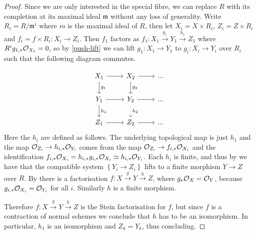 \begin{proof}
	Since we are only interested in the special fibre, we can replace $R$ with its completion at its maximal ideal $\mathfrak{m}$ without any loss of generality.
	Write $R_{i}=R/\mathfrak{m}^{i}$ where $m$ is the maximal ideal of $R$, then let $X_{i}=X \times R_{i}$, $Z_{i}=Z\times R_{i}$ and $f_{i}=f\times R_{i}\colon X_{i} \to Z_{i}$.
	Then $f_{1}$ factors as $f_{1}\colon X_{1} \xrightarrow{g_{1}} Y_{1} \xrightarrow{h_{1}} Z_{1}$ where $R^{i}g_{1,*}\ox[X_{1}]=0$, so by \autoref{push-lift} we can lift $g_{1}\colon X_{1} \to Y_{1}$ to $g_{i}\colon X_{i} \to Y_{i}$ over $R_{i}$ such that the following diagram commutes.
	
	\[\begin{tikzcd}
	X_{1} \arrow[r] \arrow[d, "g_{1}"] & X_{2} \arrow[r] \arrow[d, "g_{2}"] & ... \\
	Y_{1} \arrow[r] \arrow[d, "h_{1}"] & Y_{2} \arrow[d, dotted, "h_{2}"] \arrow[r]  & ... \\
	Z_{1} \arrow[r]                    & Z_{2} \arrow[r]                    & ...
	\end{tikzcd}\]
	Here the $h_{i}$ are defined as follows. The underlying topological map is just $h_{1}$ and the map $\ox[Z_{i}] \to h_{i,*}\ox[Y_{i}]$ comes from the map ${\ox[Z_{i}] \to f_{i,*}\ox[X_{i}]}$ and the identification $f_{i,*}\ox[X_{i}]=h_{i,*}g_{i,*}\ox[X_{i}]\simeq h_{i,*}\ox[Y_{i}]$.
	Each $h_{i}$ is finite, and thus by
	\cite[\href{https://stacks.math.columbia.edu/tag/09ZT}{Tag 09ZT}]{stacks-project} we have that the compatible system $\left\{Y_{i} \to Z_i \right\}$ lifts to a finite morphism $Y \to Z$ over $R$. By \cite[\href{https://stacks.math.columbia.edu/tag/0A42}{Tag 0A42}]{stacks-project} there is a factorisation ${f\colon X \xrightarrow{g} Y \xrightarrow{h} Z}$, where $g_{*}\ox = \cO_Y$, because $g_{i,*}\cO_{X_i}=\cO_{Y_i}$ for all $i$. Similarly $h$ is a finite morphism. 
	
	Therefore $f \colon X \xrightarrow{g} Y \xrightarrow{h} Z$ is the Stein factorisation for $f$, but since $f$ is a contraction of normal schemes we conclude that $h$ has to be an isomorphism.
	In particular, $h_1$ is an isomorphism and $Z_{k}=Y_{k}$, thus concluding.
\end{proof}

